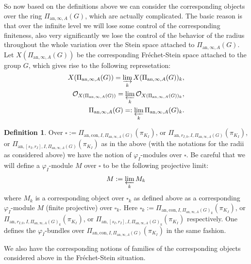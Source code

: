 \documentclass[12pt]{amsart}
\theoremstyle{definition}
\newtheorem{definition}[theorem]{Definition}
\numberwithin{equation}{section}
\begin{document}
\indent So now based on the definitions above we can consider the corresponding objects over the ring $\Pi_{\mathrm{an},\infty,A}(G)$, which are actually complicated. The basic reason is that over the infinite level we will lose some control of the corresponding finiteness, also very significantly we lose the control of the behavior of the radius throughout the whole variation over the Stein space attached to $\Pi_{\mathrm{an},\infty,A}(G)$. Let $X(\Pi_{\mathrm{an},\infty,A}(G))$ be the corresponding Fr\'echet-Stein space attached to the group $G$, which gives rise to the following represetation:
\begin{align}
X(\Pi_{\mathrm{an},\infty,A}(G))=\varinjlim_k X(\Pi_{\mathrm{an},\infty,A}(G))_k,\\
\mathcal{O}_{X(\Pi_{\mathrm{an},\infty,A}(G))}= \varprojlim_k \mathcal{O}_{X(\Pi_{\mathrm{an},\infty,A}(G))_k	},\\
\Pi_{\mathrm{an},\infty,A}(G)=: \varprojlim_k \Pi_{\mathrm{an},\infty,A}(G)_k.
\end{align}




\begin{definition} 
Over $\square:=\Pi_{\mathrm{an},\mathrm{con},I,\Pi_{\mathrm{an},\infty,A}(G)}(\pi_{K_I})$, or $\Pi_{\mathrm{an},r_{I,0},I,\Pi_{\mathrm{an},\infty,A}(G)}(\pi_{K_I})$, or $\Pi_{\mathrm{an},[s_I,r_I],I,\Pi_{\mathrm{an},\infty,A}(G)}(\pi_{K_I})$ as in the above (with the notations for the radii as considered above) we have the notion of $\varphi_I$-modules over $\square$. Be careful that we will define a $\varphi_I$-module $M$ over $\square$ to be the following projective limit:
\begin{align}
M:=\varprojlim_k M_k	
\end{align}
where $M_k$ is a corresponding object over $\square_k$ as defined above as a corresponding $\varphi_I$-module $M$ (finite projective) over $\square_k$. Here $\square_k:=\Pi_{\mathrm{an},\mathrm{con},I,\Pi_{\mathrm{an},\infty,A}(G)_k}(\pi_{K_I})$, or $\Pi_{\mathrm{an},r_{I,0},I,\Pi_{\mathrm{an},\infty,A}(G)_k}(\pi_{K_I})$, or $\Pi_{\mathrm{an},[s_I,r_I],I,\Pi_{\mathrm{an},\infty,A}(G)_k}(\pi_{K_I})$ respectively. One defines the $\varphi_I$-bundles over $\Pi_{\mathrm{an},\mathrm{con},I,\Pi_{\mathrm{an},\infty,A}(G)}(\pi_{K_I})$ in the same fashion.
\end{definition}


\indent We also have the corresponding notions of families of the corresponding objects considered above in the Fr\'echet-Stein situation.
\end{document}
